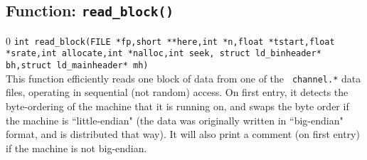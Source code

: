 \subsection{Function: {\tt read\_block()}}
\setcounter{equation}0
{\tt int read\_block(FILE *fp,short **here,int *n,float *tstart,float *srate,int allocate,int *nalloc,int seek,
struct ld\_binheader* bh,struct ld\_mainheader* mh)}\\
This function efficiently reads one block of data from one of the {\tt
channel.*} data files, operating in sequential (not random) access.
On first entry, it detects the byte-ordering of the machine that it is
running on, and swaps the byte order if the machine is ``little-endian"
(the data was originally written in ``big-endian" format, and is
distributed that way).  It will also print a comment (on first entry)
if the machine is not big-endian.

